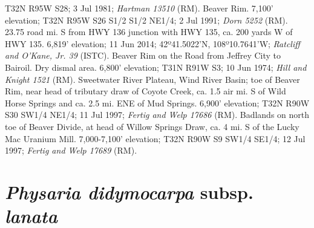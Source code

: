 T32N R95W S28; 3 Jul 1981; \textit{Hartman 13510} (RM).
Beaver Rim. 7,100' elevation; T32N R95W S26 S1/2 S1/2 NE1/4; 2 Jul 1991;
\textit{Dorn 5252} (RM).
23.75 road mi. S from HWY 136 junction with HWY 135, ca. 200 yards W of HWY 135.
6,819' elevation; 11 Jun 2014; 42º41.5022'N, 108º10.7641'W;
\textit{Ratcliff and O'Kane, Jr. 39} (ISTC).
Beaver Rim on the Road from Jeffrey City to Bairoil. Dry dismal area.
6,800' elevation; T31N R91W S3; 10 Jun 1974; \textit{Hill and Knight 1521} (RM).
Sweetwater River Plateau, Wind River Basin; toe of Beaver Rim, near head of
tributary draw of Coyote Creek, ca. 1.5 air mi. S of Wild Horse Springs and ca.
2.5 mi. ENE of Mud Springs. 6,900' elevation; T32N R90W S30 SW1/4 NE1/4;
11 Jul 1997; \textit{Fertig and Welp 17686} (RM).
Badlands on north toe of Beaver Divide, at head of Willow Springs Draw, ca. 4
mi. S of the Lucky Mac Uranium Mill. 7,000-7,100' elevation; T32N R90W S9 SW1/4
SE1/4; 12 Jul 1997; \textit{Fertig and Welp 17689} (RM).

\section*{\textit{Physaria didymocarpa} subsp. \textit{lanata}}

